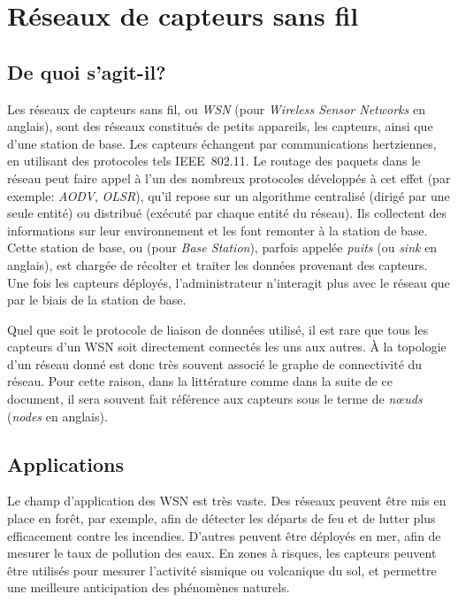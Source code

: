 \section{Réseaux de capteurs sans fil}
\label{st:sec:contexte}
    \subsection{De quoi s'agit-il?}
Les réseaux de capteurs sans fil, ou \textit{WSN} (pour \textit{Wireless Sensor Networks} en anglais), sont des réseaux constitués de petits appareils, les capteurs, ainsi que d'une station de base.
Les capteurs échangent par communications hertziennes, en utilisant des protocoles tels IEEE~802.11.
Le routage des paquets dans le réseau peut faire appel à l'un des nombreux protocoles développés à cet effet (par exemple: \textit{AODV}, \textit{OLSR}), qu'il repose sur un algorithme centralisé (dirigé par une seule entité) ou distribué (exécuté par chaque entité du réseau).
Ils collectent des informations sur leur environnement et les font remonter à la station de base.
Cette station de base, ou \BS (pour \textit{Base Station}), parfois appelée \textit{puits} (ou \textit{sink} en anglais), est chargée de récolter et traiter les données provenant des capteurs.
Une fois les capteurs déployés, l'administrateur n'interagit plus avec le réseau que par le biais de la station de base.

Quel que soit le protocole de liaison de données utilisé, il est rare que tous les capteurs d'un WSN soit directement connectés les uns aux autres.
À la topologie d'un réseau donné est donc très souvent associé le graphe de connectivité du réseau.
Pour cette raison, dans la littérature comme dans la suite de ce document, il sera souvent fait référence aux capteurs sous le terme de \textit{nœuds} (\textit{nodes} en anglais).

    \subsection{Applications}
Le champ d'application des WSN est très vaste.
Des réseaux peuvent être mis en place en forêt, par exemple, afin de détecter les départs de feu et de lutter plus efficacement contre les incendies.
D'autres peuvent être déployés en mer, afin de mesurer le taux de pollution des eaux.
En zones à risques, les capteurs peuvent être utilisés pour mesurer l'activité sismique ou volcanique du sol, et permettre une meilleure anticipation des phénomènes naturels.

